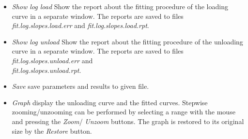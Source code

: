 \begin{itemize}
 \item \emph{Show log load} Show the report about the fitting procedure of the loading curve in a separate window.  The reports are saved to files \emph{fit.log.slopes.load.err} and \emph{fit.log.slopes.load.rpt}. 
 \item \emph{Show log unload} Show the report about the fitting procedure of the unloading curve in a separate window.  The reports are saved to files \emph{fit.log.slopes.unload.err} and \\ \emph{fit.log.slopes.unload.rpt}. 
 \item \emph{Save} save parameters and results to given file. 
 \item \emph{Graph} display the unloading curve and the fitted curves. Stepwise zooming/unzooming can be performed by selecting a range with the mouse and pressing the \emph{Zoom}/ \emph{Unzoom} buttons. The graph is restored to its original size by the \emph{Restore} button.
\end{itemize}

